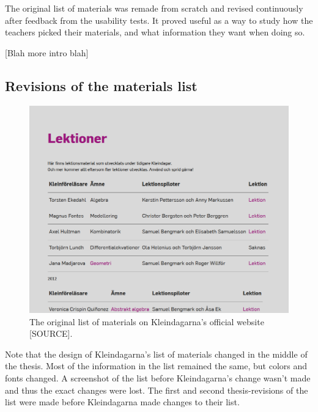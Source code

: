 The original list of materials was remade from scratch and revised continuously after feedback from the usability tests. It proved useful as a way to study how the teachers picked their materials, and what information they want when doing so.

[Blah more intro blah]

\subsection{Revisions of the materials list}

\begin{figure}[H]
\centering
\includegraphics[width=\linewidth]{figure/screenshot_materiallista_kleindagarna.png}
\caption{The original list of materials on Kleindagarna's official website [SOURCE].}
\end{figure}

Note that the design of Kleindagarna's list of materials changed in the middle of the thesis. Most of the information in the list remained the same, but colors and fonts changed. A screenshot of the list before Kleindagarna's change wasn't made and thus the exact changes were lost. The first and second thesis-revisions of the list were made before Kleindagarna made changes to their list.

